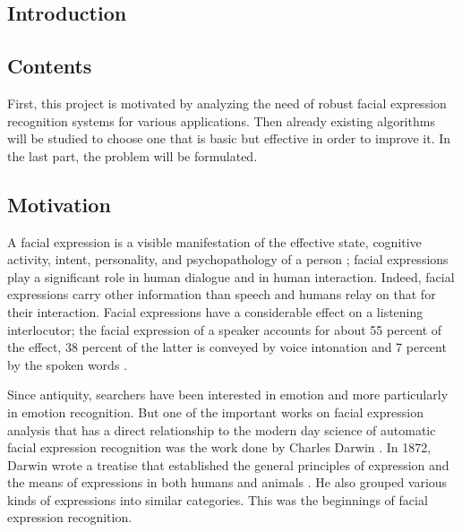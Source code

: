   \begin{titlepage}
    \vspace*{\fill}
      \part{Introduction}
    \vspace*{\fill}
  \end{titlepage}

\chapter*{Contents}

First, this project is motivated by analyzing the need of robust facial expression recognition systems for various applications. Then already existing algorithms will be studied to choose one that is basic but effective in order to improve it. In the last part, the problem will be formulated.

\chapter{Motivation}

A facial expression is a visible manifestation of the effective state, cognitive activity, intent, personality, and psychopathology of a person \cite{DON99}; facial expressions play a significant role in human dialogue and in human interaction. Indeed, facial expressions carry other information than speech and humans relay on that for their interaction. Facial expressions have a considerable effect on a listening interlocutor; the facial expression of a speaker accounts for about 55 percent of the effect, 38 percent of the latter is conveyed by voice intonation and 7 percent by the spoken words \cite{PAN00}.
\newline

\noindent Since antiquity, searchers have been interested in emotion and more particularly in emotion recognition. But one of the important works on facial expression analysis that has a direct relationship to the modern day science of automatic facial expression recognition was the work done by Charles Darwin \cite{BET12}. In 1872, Darwin wrote a treatise that established the general principles of expression and the means of expressions in both humans and animals \cite{DAR04}. He also grouped various kinds of expressions into similar categories. This was the beginnings of facial expression recognition.
\newline


